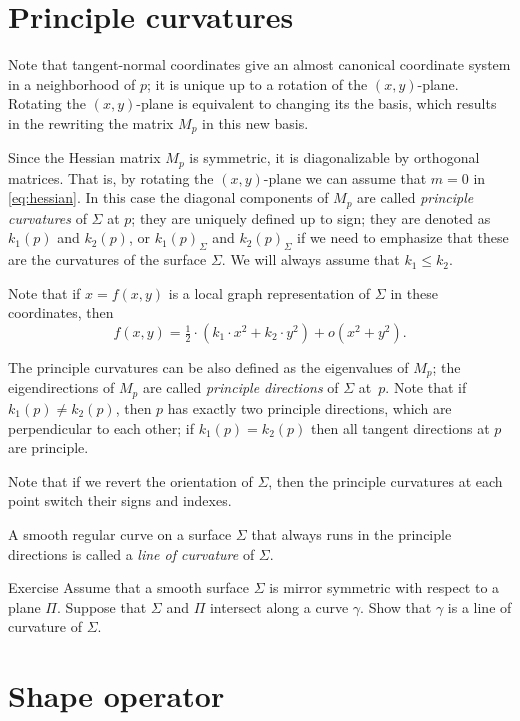 \section*{Principle curvatures}

Note that tangent-normal coordinates give an almost canonical coordinate system in a neighborhood of $p$;
it is unique up to a rotation of  the $(x,y)$-plane.
Rotating the $(x,y)$-plane is equivalent to changing its the basis, which results in the rewriting   
the matrix $M_p$ in this new basis.

Since the Hessian matrix $M_p$ is symmetric, it is diagonalizable by orthogonal matrices.
That is, by rotating the $(x,y)$-plane we can assume that $m=0$ in \ref{eq:hessian}. %
In this case the diagonal components of $M_p$ are called \emph{principle curvatures} of $\Sigma$ at $p$;
they are uniquely defined up to sign;
they are denoted as $k_1(p)$ and $k_2(p)$, or $k_1(p)_\Sigma$ and $k_2(p)_\Sigma$ if we need to emphasize that these are the curvatures of the surface $\Sigma$.
We will always assume that $k_1\le k_2$.

Note that if $x=f(x,y)$ is a local graph representation of $\Sigma$ in these coordinates, then 
\[f(x,y)=\tfrac12\cdot(k_1\cdot x^2+k_2\cdot y^2)+o(x^2+y^2).\]

The principle curvatures can be also defined as the eigenvalues of $M_p$;
the eigendirections of $M_p$ are called \emph{principle directions} of $\Sigma$ at~$p$.
Note that if $k_1(p)\ne k_2(p)$, then $p$ has exactly two principle directions, which are perpendicular to each other; if $k_1(p)= k_2(p)$ then all tangent directions at $p$ are principle.

Note that if we revert the orientation of $\Sigma$, then the principle curvatures at each point switch their signs and indexes.

A smooth regular curve on a surface $\Sigma$ that always runs in the principle directions is called a \emph{line of curvature} of $\Sigma$.  

\begin{thm}{Exercise}\label{ex:line-of-curvature}
Assume that a smooth surface $\Sigma$ is mirror symmetric with respect to  a plane $\Pi$.
Suppose that $\Sigma$ and $\Pi$ intersect along a curve $\gamma$.
Show that $\gamma$ is a line of curvature of $\Sigma$.
\end{thm}

\section*{Shape operator}

